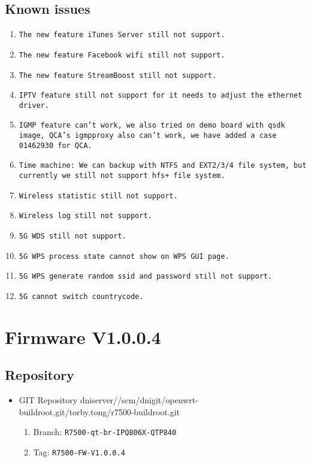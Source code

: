 \documentclass[12pt]{report}
\newcommand{\tlabel}[1]{
  \label{#1}%
  }
\begin{document}
\subsection{Known issues}
            \begin{enumerate}
	    	\item \texttt{The new feature iTunes Server still not support.}
		\item \texttt{The new feature Facebook wifi still not support.}
		\item \texttt{The new feature StreamBoost still not support.}
		\item \texttt{IPTV feature still not support for it needs to adjust the ethernet driver.}
		\item \texttt{IGMP feature can't work, we also tried on demo board with qsdk image, QCA's igmpproxy also can't work, we have added a case 01462930 for QCA.}
		\item \texttt{Time machine: We can backup with NTFS and EXT2/3/4 file system, but currently we still not support hfs+ file system.}
		\item \texttt{Wireless statistic still not support.}
		\item \texttt{Wireless log still not support.}
		\item \texttt{5G WDS still not support.}
		\item \texttt{5G WPS process state cannot show on WPS GUI page.}
		\item \texttt{5G WPS generate random ssid and password still not support.}
		\item \texttt{5G cannot switch countrycode.}
            \end{enumerate}

\section{Firmware V1.0.0.4}

\tlabel{sec:1-0-1}
\subsection{Repository}
\begin{itemize}
	\item GIT Repository dniserver//scm/dnigit/openwrt-buildroot.git/torby.tong/r7500-buildroot.git
	\begin{enumerate}
    		\item Branch: \texttt{R7500-qt-br-IPQ806X-QTP840}
                \item Tag: \texttt{R7500-FW-V1.0.0.4}
    	\end{enumerate}
\end{itemize}
\end{document}
